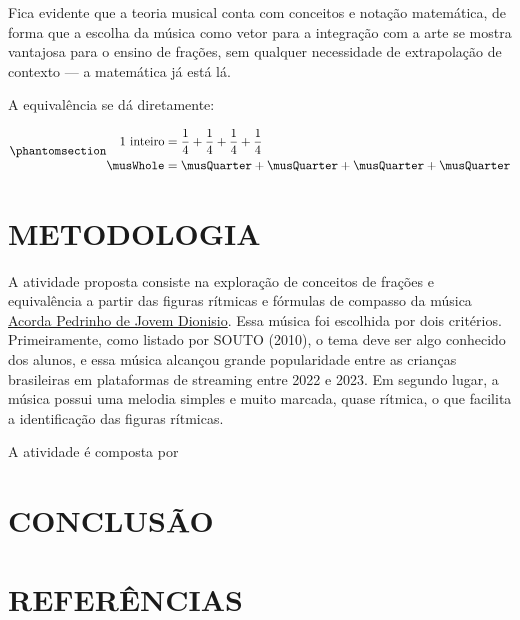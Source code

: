 \documentclass[
  letterpaper,
  DIV=11,
  numbers=noendperiod]{scrreprt}
\begin{document}
Fica evidente que a teoria musical conta com conceitos e notação
matemática, de forma que a escolha da música como vetor para a
integração com a arte se mostra vantajosa para o ensino de frações, sem
qualquer necessidade de extrapolação de contexto --- a matemática já
está lá.

A equivalência se dá diretamente:

\begin{equation}\phantomsection\label{eq-fracao}{
\begin{aligned}
  \text{1 inteiro} &= \frac{1}{4} + \frac{1}{4} + \frac{1}{4} + \frac{1}{4} \\
 \musWhole &= \musQuarter + \musQuarter + \musQuarter + \musQuarter
\end{aligned}
}\end{equation}

\chapter{METODOLOGIA}\label{metodologia}

A atividade proposta consiste na exploração de conceitos de frações e
equivalência a partir das figuras rítmicas e fórmulas de compasso da
música
\href{https://open.spotify.com/intl-pt/track/2sUhjzuc6w4SRFwoC3LvXZ?si=594a3325c9c24baa}{Acorda
Pedrinho de Jovem Dionisio}. Essa música foi escolhida por dois
critérios. Primeiramente, como listado por SOUTO (2010), o tema deve ser
algo conhecido dos alunos, e essa música alcançou grande popularidade
entre as crianças brasileiras em plataformas de streaming entre 2022 e
2023. Em segundo lugar, a música possui uma melodia simples e muito
marcada, quase rítmica, o que facilita a identificação das figuras
rítmicas.

A atividade é composta por

\chapter{CONCLUSÃO}\label{conclusuxe3o}

\chapter*{REFERÊNCIAS}\label{referuxeancias}
\end{document}
